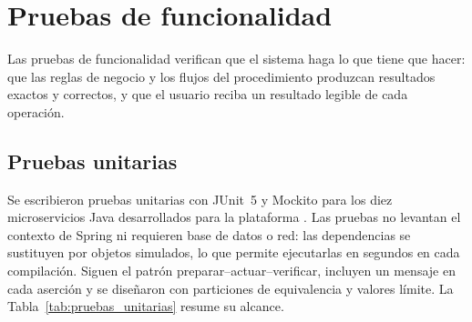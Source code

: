 	\section{Pruebas de funcionalidad}
	\label{sec:pruebas_funcionalidad}
	Las pruebas de funcionalidad verifican que el sistema haga lo que tiene que hacer: que las reglas
	de negocio y los flujos del procedimiento produzcan resultados exactos y correctos, y que el usuario
	reciba un resultado legible de cada operación.

	\subsection{Pruebas unitarias}
	Se escribieron pruebas unitarias con JUnit~5 y Mockito para los diez microservicios Java
	desarrollados para la plataforma \cite{junit5, mockito}. Las pruebas no levantan el contexto de
	Spring ni requieren base de datos o red: las dependencias se sustituyen por objetos simulados, lo que
	permite ejecutarlas en segundos en cada compilación. Siguen el patrón preparar--actuar--verificar, incluyen
	un mensaje en cada aserción y se diseñaron con particiones de equivalencia y valores límite. La
	Tabla~\ref{tab:pruebas_unitarias} resume su alcance.


